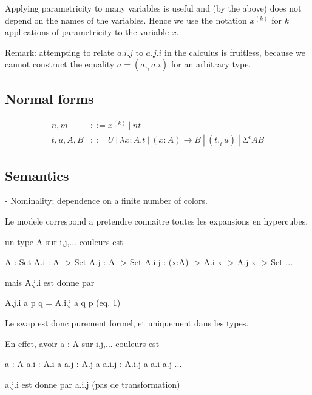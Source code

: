 \documentclass[10pt,a4paper]{article}
\newcommand\CC[4]{(#2,_{#1} #3)}
\newcommand\CP[3]{(#2,_{#1} #3)}
\newcommand\CSig[1]{\Sigma^{#1}}
\newcommand\pvar[2]{{#1}^{(#2)}}
\begin{document}
Applying parametricity to many variables is useful and (by the above)
does not depend on the names of the variables. Hence we use the
notation $\pvar x k$ for $k$ applications of parametricity to the
variable $x$.

Remark: attempting to relate $a.i.j$ to $a.j.i$ in the calculus is
fruitless, because we cannot construct the equality $a = \CP i a
{a.i}$ for an arbitrary type.

\subsection{Normal forms}

\begin{align*}
  n,m & ::= \pvar x k ~|~ n t \\
  t,u,A,B & ::= U ~|~ λx:A. t   ~|~  (x:A) → B
             ~|~ \CC i t u A ~|~ \CSig i A B
\end{align*}


\subsection{Semantics}

- Nominality; dependence on a finite number of colors.

Le modele correspond a pretendre connaitre toutes les expansions en hypercubes.

un type A sur i,j,... couleurs est

A : Set
A.i : A -> Set
A.j : A -> Set
A.i.j : (x:A) -> A.i x -> A.j x -> Set
...

mais A.j.i est donne par

A.j.i a p q = A.i.j a q p     (eq. 1)

Le swap est donc purement formel, et uniquement dans les types.

En effet, avoir a : A sur i,j,... couleurs est

a : A
a.i : A.i a
a.j : A.j a
a.i.j : A.i.j a a.i a.j
...

a.j.i est donne par a.i.j (pas de transformation)
\end{document}
